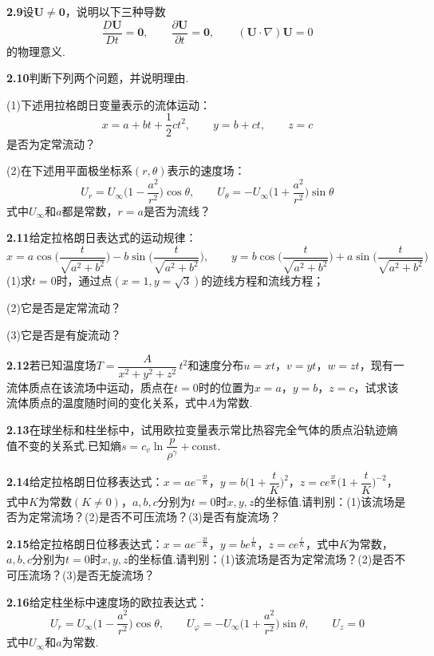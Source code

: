 \medskip
\noindent\textbf{2.9}\quad 设$\boldsymbol{U}\neq\boldsymbol{0}$，说明以下三种导数
\[
\frac{D\boldsymbol{U}}{Dt}=\boldsymbol{0},\qquad \frac{\partial\boldsymbol{U}}{\partial t}=\boldsymbol{0},\qquad (\boldsymbol{U}\cdot\nabla)\boldsymbol{U}=0
\]
的物理意义.

\medskip
\noindent\textbf{2.10}\quad 判断下列两个问题，并说明理由.

(1)下述用拉格朗日变量表示的流体运动：
\[
x=a+bt+\frac{1}{2}ct^{2},\qquad y=b+ct,\qquad z=c
\]
是否为定常流动？

(2)在下述用平面极坐标系$(r,\theta)$表示的速度场：
\[
U_r=U_\infty\Big(1-\frac{a^{2}}{r^{2}}\Big)\cos\theta,\qquad U_\theta=-U_\infty\Big(1+\frac{a^{2}}{r^{2}}\Big)\sin\theta
\]
式中$U_\infty$和$a$都是常数，$r=a$是否为流线？

\medskip
\noindent\textbf{2.11}\quad 给定拉格朗日表达式的运动规律：
\[
x=a\cos\Big(\frac{t}{\sqrt{a^{2}+b^{2}}}\Big)-b\sin\Big(\frac{t}{\sqrt{a^{2}+b^{2}}}\Big),\qquad
y=b\cos\Big(\frac{t}{\sqrt{a^{2}+b^{2}}}\Big)+a\sin\Big(\frac{t}{\sqrt{a^{2}+b^{2}}}\Big)
\]
(1)求$t=0$时，通过点$(x=1,y=\sqrt{3})$的迹线方程和流线方程；

(2)它是否是定常流动？

(3)它是否是有旋流动？

\medskip
\noindent\textbf{2.12}\quad 若已知温度场$T=\dfrac{A}{x^{2}+y^{2}+z^{2}}\,t^{2}$和速度分布$u=xt$，$v=yt$，$w=zt$，现有一流体质点在该流场中运动，质点在$t=0$时的位置为$x=a$，$y=b$，$z=c$，试求该流体质点的温度随时间的变化关系，式中$A$为常数.

\medskip
\noindent\textbf{2.13}\quad 在球坐标和柱坐标中，试用欧拉变量表示常比热容完全气体的质点沿轨迹熵值不变的关系式.已知熵$s=c_v\ln\dfrac{p}{\rho^{\gamma}}+\mathrm{const.}$

\medskip
\noindent\textbf{2.14}\quad 给定拉格朗日位移表达式：$x=ae^{-\frac{2t}{K}}$，$y=b\Big(1+\dfrac{t}{K}\Big)^{2}$，$z=ce^{\frac{2t}{K}}\Big(1+\dfrac{t}{K}\Big)^{-2}$，式中$K$为常数$(K\neq 0)$，$a,b,c$分别为$t=0$时$x,y,z$的坐标值.请判别：(1)该流场是否为定常流场？(2)是否不可压流场？(3)是否有旋流场？

\medskip
\noindent\textbf{2.15}\quad 给定拉格朗日位移表达式：$x=ae^{-\frac{2t}{K}}$，$y=be^{\frac{t}{K}}$，$z=ce^{\frac{t}{K}}$，式中$K$为常数，$a,b,c$分别为$t=0$时$x,y,z$的坐标值.请判别：(1)该流场是否为定常流场？(2)是否不可压流场？(3)是否无旋流场？

\medskip
\noindent\textbf{2.16}\quad 给定柱坐标中速度场的欧拉表达式：
\[
U_r=U_\infty\Big(1-\frac{a^{2}}{r^{2}}\Big)\cos\theta,\qquad U_\varphi=-U_\infty\Big(1+\frac{a^{2}}{r^{2}}\Big)\sin\theta,\qquad U_z=0
\]
式中$U_\infty$和$a$为常数.

